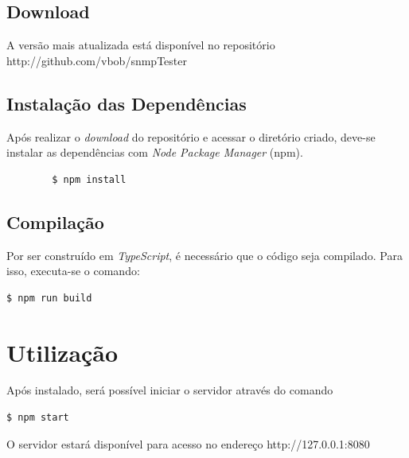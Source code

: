 \documentclass{article}
\begin{document}
\subsection{Download}

A versão mais atualizada está disponível no repositório http://github.com/vbob/snmpTester

\subsection{Instalação das Dependências}

Após realizar o \textit{download} do repositório e acessar o diretório criado, deve-se instalar as dependências com \textit{Node Package Manager} (npm).

\begin{commandline}
	\begin{verbatim}
		$ npm install
	\end{verbatim}
\end{commandline}

\subsection{Compilação}

\par Por ser construído em \textit{TypeScript}, é necessário que o código seja compilado. Para isso, executa-se o comando:

\begin{commandline}
\begin{verbatim}
$ npm run build
\end{verbatim}
\end{commandline}


\section{Utilização}

Após instalado, será possível iniciar o servidor através do comando

\begin{commandline}
\begin{verbatim}
$ npm start
\end{verbatim}
\end{commandline}

O servidor estará disponível para acesso no endereço http://127.0.0.1:8080
\end{document}
